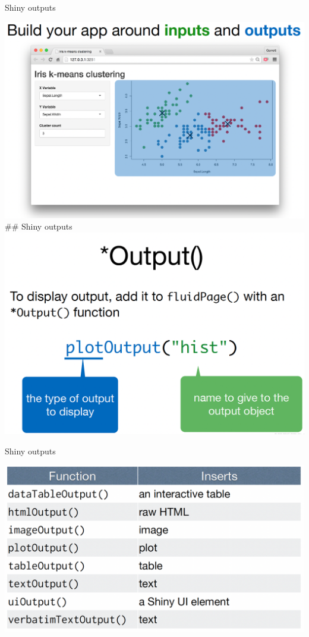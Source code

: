 \documentclass[
  ignorenonframetext,
]{beamer}
\begin{document}
\begin{frame}{Shiny outputs}
\label{shiny-outputs}
\center

\includegraphics{shinyfigs/shiny_in_out_1.png} \#\# Shiny outputs
\center \includegraphics{shinyfigs/shiny_output1.png}
\end{frame}

\begin{frame}{Shiny outputs}
\label{shiny-outputs-1}
\center

\includegraphics{shinyfigs/shiny_output2.png}
\end{frame}
\end{document}
